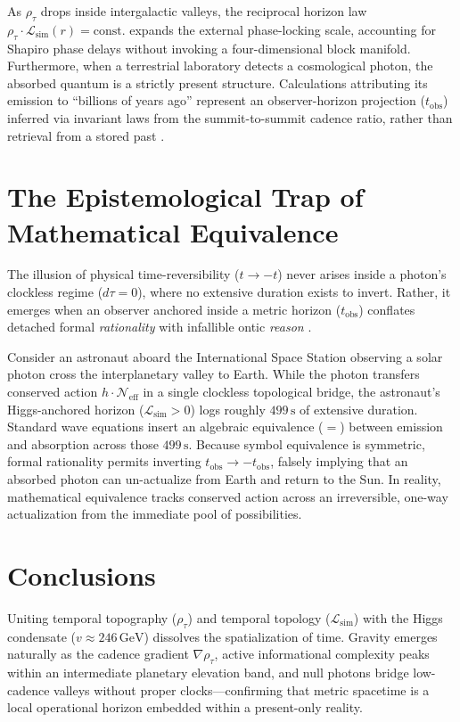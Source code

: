 \documentclass[11pt,a4paper]{article}
\theoremstyle{remark}
\begin{document}
As $\rho_\tau$ drops inside intergalactic valleys, the reciprocal horizon law $\rho_\tau \cdot \mathcal{L}_{\mathrm{sim}}(r) = \mathrm{const.}$ expands the external phase-locking scale, accounting for Shapiro phase delays \cite{shapiro1964} without invoking a four-dimensional block manifold. Furthermore, when a terrestrial laboratory detects a cosmological photon, the absorbed quantum is a strictly present structure. Calculations attributing its emission to ``billions of years ago'' represent an observer-horizon projection ($t_{\mathrm{obs}}$) inferred via invariant laws from the summit-to-summit cadence ratio, rather than retrieval from a stored past \cite{damasio_p17}.

\section{The Epistemological Trap of Mathematical Equivalence}

The illusion of physical time-reversibility ($t \to -t$) never arises inside a photon's clockless regime ($d\tau = 0$), where no extensive duration exists to invert. Rather, it emerges when an observer anchored inside a metric horizon ($t_{\mathrm{obs}}$) conflates detached formal \emph{rationality} with infallible ontic \emph{reason} \cite{frege1918}.

Consider an astronaut aboard the International Space Station observing a solar photon cross the interplanetary valley to Earth. While the photon transfers conserved action $h \cdot \mathcal{N}_{\mathrm{eff}}$ in a single clockless topological bridge, the astronaut's Higgs-anchored horizon ($\mathcal{L}_{\mathrm{sim}} > 0$) logs roughly $499\,\mathrm{s}$ of extensive duration. Standard wave equations insert an algebraic equivalence ($=$) between emission and absorption across those $499\,\mathrm{s}$. Because symbol equivalence is symmetric, formal rationality permits inverting $t_{\mathrm{obs}} \to -t_{\mathrm{obs}}$, falsely implying that an absorbed photon can un-actualize from Earth and return to the Sun. In reality, mathematical equivalence tracks conserved action across an irreversible, one-way actualization from the immediate pool of possibilities.

\section{Conclusions}

Uniting temporal topography ($\rho_\tau$) and temporal topology ($\mathcal{L}_{\mathrm{sim}}$) with the Higgs condensate ($v \approx 246\,\mathrm{GeV}$) dissolves the spatialization of time. Gravity emerges naturally as the cadence gradient $\nabla \rho_\tau$, active informational complexity peaks within an intermediate planetary elevation band, and null photons bridge low-cadence valleys without proper clocks---confirming that metric spacetime is a local operational horizon embedded within a present-only reality.
\end{document}
